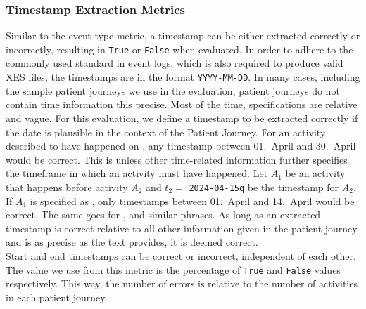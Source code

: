 \subsubsection{Timestamp Extraction Metrics}\label{sec:time_metrics}
Similar to the event type metric, a timestamp can be either extracted correctly or incorrectly, resulting in \verb|True| or \verb|False| when evaluated. In order to adhere to the commonly used standard in event logs, which is also required to produce valid XES files, the timestamps are in the format \verb|YYYY-MM-DD|. In many cases, including the sample patient journeys we use in the evaluation, patient journeys do not contain time information this precise. Most of the time, specifications are relative and vague. For this evaluation, we define a timestamp to be extracted correctly if the date is plausible in the context of the Patient Journey. For an activity described to have happened on , any timestamp between 01.~April and 30.~April would be correct. This is unless other time-related information further specifies the timeframe in which an activity must have happened. Let $A_1$ be an activity that happens before activity $A_2$ and $t_2=$ \verb|2024-04-15q| be the timestamp for $A_2$. If $A_1$ is specified as , only timestamps between 01.~April and 14.~April would be correct. The same goes for ,  and similar phrases. As long as an extracted timestamp is correct relative to all other information given in the patient journey and is as precise as the text provides, it is deemed correct.\\
Start and end timestamps can be correct or incorrect, independent of each other. The value we use from this metric is the percentage of \verb|True| and \verb|False| values respectively. This way, the number of errors is relative to the number of activities in each patient journey.

